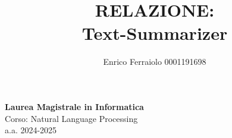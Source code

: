 \documentclass[a4paper, 12pt]{article}
\title{\textbf{RELAZIONE: \\ Text-Summarizer}}
\author{Enrico Ferraiolo 0001191698}
\date{}
\begin{document}
\maketitle

\begin{center}
    \textbf{Laurea Magistrale in Informatica}\\
    \vspace{0.3cm}
    Corso: Natural Language Processing \\
    a.a. 2024-2025
    \vspace{2cm}
\end{center}

\newpage

\tableofcontents
\newpage








\end{document}
